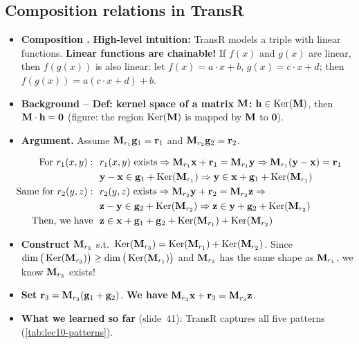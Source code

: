 \subsection{Composition relations in TransR}\label{sec:lec10-transr-comp}

\begin{itemize}
  \item \textbf{Composition \cmark.} \textbf{High-level intuition:} TransR models
    a triple with linear functions. \textbf{Linear functions are chainable!} If
    $f(x)$ and $g(x)$ are linear, then $f(g(x))$ is also linear: let
    $f(x)=a\cdot x+b$, $g(x)=c\cdot x+d$; then $f(g(x))=a(c\cdot x+d)+b$.
  \item \textbf{Background -- Def: kernel space of a matrix $\mathbf{M}$:}
    $\mathbf{h}\in\operatorname{Ker}(\mathbf{M})$, then $\mathbf{M}\cdot\mathbf{h}=\mathbf{0}$ (figure: the region
    $\operatorname{Ker}(\mathbf{M})$ is mapped by $\mathbf{M}$ to $\mathbf{0}$).
  \item \textbf{Argument.} Assume $\mathbf{M}_{r_1}\mathbf{g}_1=\mathbf{r}_1$ and
    $\mathbf{M}_{r_2}\mathbf{g}_2=\mathbf{r}_2$.
\end{itemize}
\begin{align}
  \text{For } r_1(x,y):\ \ & r_1(x,y)\text{ exists}\Rightarrow
    \mathbf{M}_{r_1}\mathbf{x}+\mathbf{r}_1=\mathbf{M}_{r_1}\mathbf{y}\Rightarrow\mathbf{M}_{r_1}(\mathbf{y}-\mathbf{x})=\mathbf{r}_1 \notag\\
  & \mathbf{y}-\mathbf{x}\in\mathbf{g}_1+\operatorname{Ker}(\mathbf{M}_{r_1})\Rightarrow\mathbf{y}\in\mathbf{x}+\mathbf{g}_1+\operatorname{Ker}(\mathbf{M}_{r_1})\notag\\
  \text{Same for } r_2(y,z):\ \ & r_2(y,z)\text{ exists}\Rightarrow
    \mathbf{M}_{r_2}\mathbf{y}+\mathbf{r}_2=\mathbf{M}_{r_2}\mathbf{z}\Rightarrow\notag\\
  & \mathbf{z}-\mathbf{y}\in\mathbf{g}_2+\operatorname{Ker}(\mathbf{M}_{r_2})\Rightarrow\mathbf{z}\in\mathbf{y}+\mathbf{g}_2+\operatorname{Ker}(\mathbf{M}_{r_2})\notag\\
  \text{Then, we have}\ \ & \mathbf{z}\in\mathbf{x}+\mathbf{g}_1+\mathbf{g}_2+\operatorname{Ker}(\mathbf{M}_{r_1})+\operatorname{Ker}(\mathbf{M}_{r_2})
    \label{eq:lec10-kernel}
\end{align}
\begin{itemize}
  \item \textbf{Construct $\mathbf{M}_{r_3}$} s.t.\
    $\operatorname{Ker}(\mathbf{M}_{r_3})=\operatorname{Ker}(\mathbf{M}_{r_1})+\operatorname{Ker}(\mathbf{M}_{r_2})$. Since
    $\dim\big(\operatorname{Ker}(\mathbf{M}_{r_3})\big)\ge\dim\big(\operatorname{Ker}(\mathbf{M}_{r_1})\big)$ and
    $\mathbf{M}_{r_3}$ has the same shape as $\mathbf{M}_{r_1}$, we know $\mathbf{M}_{r_3}$ exists!
  \item \textbf{Set} $\mathbf{r}_3=\mathbf{M}_{r_3}(\mathbf{g}_1+\mathbf{g}_2)$. \textbf{We have}
    $\mathbf{M}_{r_3}\mathbf{x}+\mathbf{r}_3=\mathbf{M}_{r_3}\mathbf{z}$.
  \item \textbf{What we learned so far} (slide~41): TransR captures all five
    patterns (\cref{tab:lec10-patterns}).
\end{itemize}

